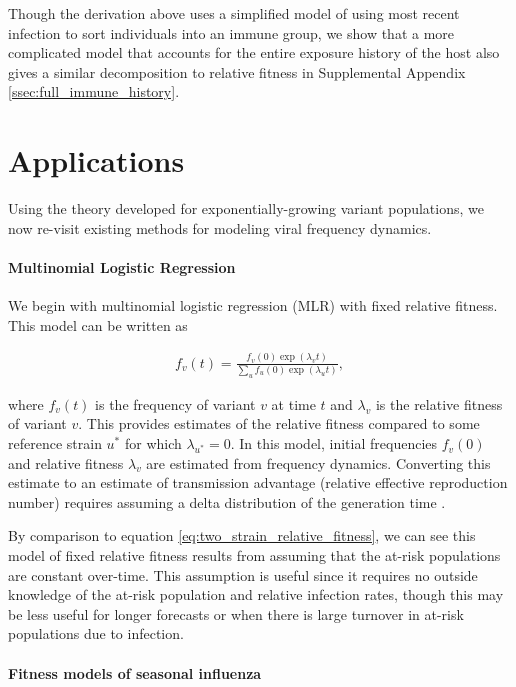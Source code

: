 \documentclass[12pt,oneside,letterpaper]{article}
\begin{document}
Though the derivation above uses a simplified model of using most recent infection to sort individuals into an immune group, we show that a more complicated model that accounts for the entire exposure history of the host also gives a similar decomposition to relative fitness in Supplemental Appendix \ref{ssec:full_immune_history}.

\section*{Applications}

Using the theory developed for exponentially-growing variant populations, we now re-visit existing methods for modeling viral frequency dynamics.

\paragraph{Multinomial Logistic Regression}%

We begin with multinomial logistic regression (MLR) with fixed relative fitness.
This model can be written as

\begin{align*}
    f_{v}(t) = \frac{f_{v}(0) \exp(\lambda_{v} t)}{\sum_{u} f_{u}(0) \exp(\lambda_{u} t)},
\end{align*}

where $f_{v}(t)$ is the frequency of variant $v$ at time $t$ and $\lambda_{v}$ is the relative fitness of variant $v$.
This provides estimates of the relative fitness compared to some reference strain $u^{*}$ for which $\lambda_{u^*} = 0$.
In this model, initial frequencies $f_{v}(0)$ and relative fitness $\lambda_{v}$ are estimated from frequency dynamics.
Converting this estimate to an estimate of transmission advantage (relative effective reproduction number) requires assuming a delta distribution of the generation time \cite{Wallinga2006}.

By comparison to equation \ref{eq:two_strain_relative_fitness}, we can see this model of fixed relative fitness results from assuming that the at-risk populations are constant over-time.
This assumption is useful since it requires no outside knowledge of the at-risk population and relative infection rates, though this may be less useful for longer forecasts or when there is large turnover in at-risk populations due to infection.

\paragraph{Fitness models of seasonal influenza}%
\end{document}
